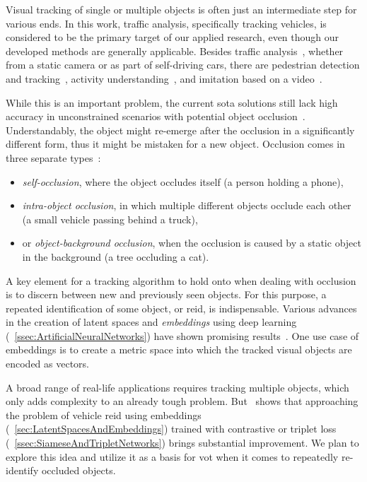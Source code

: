 Visual tracking of single or multiple objects is often just an intermediate step for various ends. In this work, traffic analysis, specifically tracking vehicles, is considered to be the primary target of our applied research, even though our developed methods are generally applicable. Besides traffic analysis~\cite{tang2019cityflow}, whether from a static camera or as part of self-driving cars, there are pedestrian detection and tracking~\cite{lealtaixe2017tracking}, activity understanding~\cite{finn2017oneshotimitation}, and imitation based on a video~\cite{peng2018sfv}.

While this is an important problem, the current \gls{sota} solutions still lack high accuracy in unconstrained scenarios with potential object occlusion~\cite{jiyan2007robustocclusion}. Understandably, the object might re-emerge after the occlusion in a significantly different form, thus it might be mistaken for a new object. Occlusion comes in three separate types~\cite{gabriel2003sotamot}:
\begin{itemize}
    \item \emph{self-occlusion}, where the object occludes itself (a person holding a phone),
    \item \emph{intra-object occlusion}, in which multiple different objects occlude each other (a small vehicle passing behind a truck),
    \item or \emph{object-background occlusion}, when the occlusion is caused by a static object in the background (a tree occluding a cat).
\end{itemize}
A key element for a tracking algorithm to hold onto when dealing with occlusion is to discern between new and previously seen objects. For this purpose, a repeated identification of some object, or \gls{reid}, is indispensable. Various advances in the creation of latent spaces and \emph{embeddings} using deep learning (\sectiontext{}~\ref{ssec:ArtificialNeuralNetworks}) have shown promising results~\cite{schroff2015facenet, taigman2014deepface}. One use case of embeddings is to create a metric space into which the tracked visual objects are encoded as vectors.

A broad range of real-life applications requires tracking multiple objects, which only adds complexity to an already tough problem. But~\cite{kuma2019vehiclereid} shows that approaching the problem of vehicle \gls{reid} using embeddings (\sectiontext{}~\ref{sec:LatentSpacesAndEmbeddings}) trained with contrastive or triplet loss (\sectiontext{}~\ref{ssec:SiameseAndTripletNetworks}) brings substantial improvement. We plan to explore this idea and utilize it as a basis for \gls{vot} when it comes to repeatedly re-identify occluded objects.

